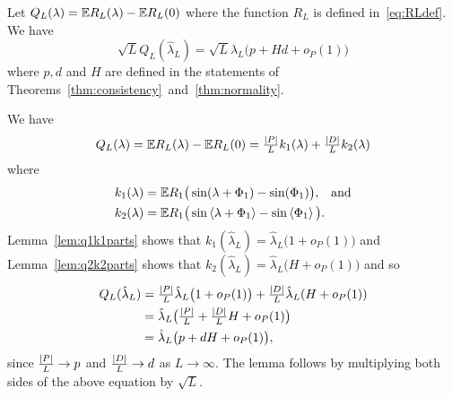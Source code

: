 \documentclass[draftcls, onecolumn, 11pt]{IEEEtran}
\begin{document}
\begin{lemma}\label{lem:Qconv}
Let $Q_L(\lambda) = {\mathbb E} R_L(\lambda) - {\mathbb E} R_L(0)$ where the function $R_L$ is defined in~\eqref{eq:RLdef}.  We have
\[ 
\sqrt{L} Q_L(\hat{\lambda}_L) = \sqrt{L} \hat{\lambda}_L\big( p + Hd  + o_P(1) \big)
\]
where $p, d$ and $H$ are defined in the statements of Theorems~\ref{thm:consistency}~and~\ref{thm:normality}.
\end{lemma}
\begin{IEEEproof}
We have
\[
Q_L(\lambda) = {\mathbb E} R_L(\lambda) - {\mathbb E} R_L(0) = \tfrac{{\vert P \vert}}{L} k_1(\lambda) + \tfrac{{\vert D \vert}}{L} k_2(\lambda)
\]
where
\begin{align}
k_1(\lambda) &= {\mathbb E} R_1\big( \sin(\lambda + \Phi_1) - \sin(\Phi_1) \big), \;\;\; \text{and} \nonumber\\
k_2(\lambda) &= {\mathbb E} R_1\big( \sin\left\langle \lambda + \Phi_1 \right\rangle - \sin\left\langle \Phi_1 \right\rangle \big). \label{eq:k2def}
\end{align}
Lemma~\ref{lem:q1k1parts} shows that $k_1(\hat{\lambda}_L) = \hat{\lambda}_L\big(1 + o_P(1) \big)$ and Lemma~\ref{lem:q2k2parts} shows that $k_2(\hat{\lambda}_L) = \hat{\lambda}_L \big( H + o_P(1) \big)$ and so
\begin{align*}
Q_L(\hat{\lambda}_L) &=  \tfrac{{\vert P \vert}}{L} \hat{\lambda}_L \big( 1  + o_P(1)\big)  + \tfrac{{\vert D \vert}}{L} \hat{\lambda}_L ( H + o_P(1) ) \\
&= \hat{\lambda}_L \big( \tfrac{{\vert P \vert}}{L}  + \tfrac{{\vert D \vert}}{L} H + o_P(1) \big) \\
 &= \hat{\lambda}_L \big( p  + d H + o_P(1) \big),
 \end{align*}
since $\frac{{\vert P \vert}}{L} \rightarrow p$ and $\frac{{\vert D \vert}}{L} \rightarrow d$ as $L \rightarrow \infty$.  The lemma follows by multiplying both sides of the 
above equation by $\sqrt{L}$.

\end{IEEEproof}
\end{document}
